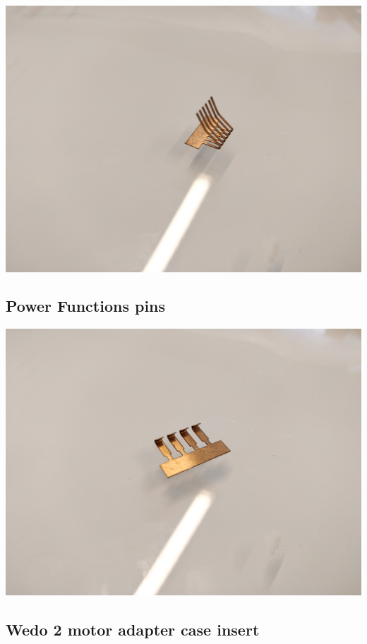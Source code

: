 \documentclass[a4paper,12pt]{article}
\begin{document}
\includegraphics[width=13.5cm]{wedo2-pins.jpg}

\subsection{Power Functions pins}

\includegraphics[width=13.5cm]{power-functions-pins.jpg}

\subsection{Wedo 2 motor adapter case insert}
\end{document}
